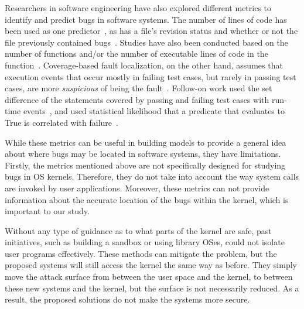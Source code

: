 Researchers in software engineering have also %
explored different metrics to identify and predict bugs in software systems. 
The number of lines of code has been used as one 
predictor~\cite{Bug-Location}, as has a file's revision status and 
whether or not the file previously contained bugs~\cite{Bug-Location, 
lewis2013does}. Studies have also been conducted based on 
the number of functions and/or the number of executable lines of code in
the function~\cite{Mining-Metrics}. Coverage-based fault localization, 
on the other hand, assumes that execution events that occur mostly in failing
test cases, but rarely in passing test cases, are more \textit{suspicious} 
of being the fault~\cite{jones2002visualization}. Follow-on work used 
the set difference of the statements covered by passing and failing test 
cases with run-time events~\cite{agrawal1995fault, jones2005empirical}, 
and used statistical likelihood that a predicate that evaluates to True is 
correlated with failure~\cite{liblit2005scalable}. 

While these metrics can be useful in building models to provide a general
idea about 
where bugs may be located in software systems, they have limitations. 
Firstly, the metrics mentioned above are not specifically designed for
studying bugs in OS kernels. 
Therefore, they do not take into account the way system calls are invoked
by user applications. 
Moreover, these metrics can not provide information about the accurate
location of the bugs within the kernel, 
which is important to our study.

Without any type of guidance as to what parts of the kernel are safe, past
initiatives, 
such as building a sandbox or using library OSes, could not 
isolate user programs effectively.  
These methods can mitigate the problem, but the proposed systems will still
access the kernel the same way as before. 
They simply move the attack surface from between the user space and the
kernel, 
to between these new systems and the kernel, but the surface is not
necessarily reduced. 
As a result, the proposed solutions do not make the systems more secure. 


